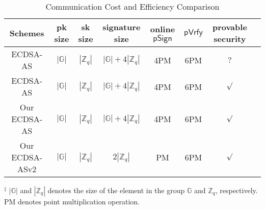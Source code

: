 \documentclass{llncs}
\begin{document}
\begin{table*}[!htbp]
\begin{center}
\caption{Communication Cost and Efficiency Comparison}\label{Communication Cost and Efficiency Comparison}
\begin{tabular}{|c|c|c|c|c|c|c|c|}
\hline

Schemes & pk size & sk size & signature size  &  online $\mathsf{pSign}$  & $\mathsf{pVrfy}$  & provable security\\   

\hline
ECDSA-AS   & $|\mathbb{G}|$ & $|\mathbb{Z}_q|$ &  $|\mathbb{G}|+4|\mathbb{Z}_q|$  & 4PM  & 6PM  & $?$  \\
\hline
ECDSA-AS   & $|\mathbb{G}|$ & $|\mathbb{Z}_q|$ &  $|\mathbb{G}|+4|\mathbb{Z}_q|$  & 4PM  & 6PM & $\surd$  \\
\hline
Our ECDSA-AS   & $|\mathbb{G}|$ & $|\mathbb{Z}_q|$ &  $|\mathbb{G}|+4|\mathbb{Z}_q|$  & 4PM  & 6PM  & $\surd$  \\
\hline
Our ECDSA-ASv2   & $|\mathbb{G}|$ & $|\mathbb{Z}_q|$ &  $2|\mathbb{Z}_q|$  & PM  & 6PM  & $\surd$  \\
\hline
\end{tabular}
\end{center}
\scriptsize{$^\ddagger$ $|\mathbb{G}|$ and $|\mathbb{Z}_q|$ denotes the size of the element in the group $\mathbb{G}$ and $\mathbb{Z}_q$, respectively. PM denotes point multiplication operation.}
\end{table*}
\end{document}
